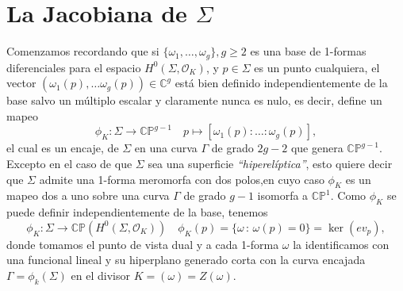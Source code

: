 \documentclass[letterpaper]{article}
\newcommand{\ga}{\ensuremath{\Gamma}}
\newcommand{\sig}{\ensuremath{\Sigma}}
\newcommand{\co}{\ensuremath{\mathbb C }}
\newcommand{\cp}{\ensuremath{\mathbb{CP}}}
\newcommand{\lnb}{\ensuremath{\mathcal{O}}}
\begin{document}
\section{La Jacobiana de \(\sig\)}
\noindent Comenzamos recordando que si \(\{\omega_{1},\dots,\omega_{g}\},g\geq2\) es una base de 1-formas diferenciales para el espacio \(H^{0}(\sig,\lnb_{K})\), y \(p\in\sig\) es un punto cualquiera, el vector \((\omega_{1}(p),\dots\omega_{g}(p))\in\co^{g}\) está bien definido independientemente de la base salvo un múltiplo escalar y claramente nunca es nulo, es decir, define un mapeo
\[
  \phi_{K}:\sig\rightarrow\cp^{g-1}\quad p\mapsto[\omega_{1}(p):\dots:\omega_{g}(p)],
\]
\noindent el cual es un encaje, de \(\sig\) en una curva \(\ga\) de grado \(2g-2\) que genera \(\cp^{g-1}\). Excepto en el caso de que \(\sig\) sea una superficie \emph{``hiperelíptica''}, esto quiere decir que \(\sig\) admite una  1-forma meromorfa con dos polos,en cuyo caso \(\phi_{K}\) es un mapeo dos a uno sobre una curva \(\ga\) de grado \(g-1\) isomorfa a \(\cp^{1}\).
Como \(\phi_{K}\) se puede definir independientemente de la base, tenemos
\[
  \phi_{K}:\sig\rightarrow\cp(H^{0}(\sig,\lnb_{K}))\quad\phi_{K}(p)=\{\omega\,:\,\omega(p)=0\}=\ker(ev_{p}),
\]
\noindent donde tomamos el punto de vista dual y a cada 1-forma \(\omega\) la identificamos con una funcional lineal y su hiperplano generado corta con la curva encajada \(\ga=\phi_{k}(\sig)\) en el divisor \(K=(\omega)=Z(\omega)\).
\end{document}
